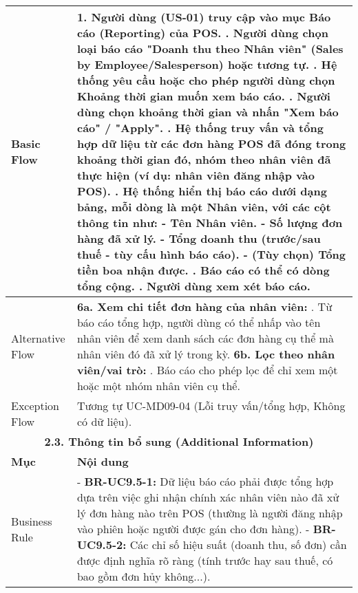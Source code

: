 \begin{longtable}{|m{4cm}|p{11cm}|}
Basic Flow & 1. Người dùng (US-01) truy cập vào mục Báo cáo (Reporting) của POS. \newline 2. Người dùng chọn loại báo cáo "Doanh thu theo Nhân viên" (Sales by Employee/Salesperson) hoặc tương tự. \newline 3. Hệ thống yêu cầu hoặc cho phép người dùng chọn Khoảng thời gian muốn xem báo cáo. \newline 4. Người dùng chọn khoảng thời gian và nhấn "Xem báo cáo" / "Apply". \newline 5. Hệ thống truy vấn và tổng hợp dữ liệu từ các đơn hàng POS đã đóng trong khoảng thời gian đó, nhóm theo nhân viên đã thực hiện (ví dụ: nhân viên đăng nhập vào POS). \newline 6. Hệ thống hiển thị báo cáo dưới dạng bảng, mỗi dòng là một Nhân viên, với các cột thông tin như: \newline    - Tên Nhân viên. \newline    - Số lượng đơn hàng đã xử lý. \newline    - Tổng doanh thu (trước/sau thuế - tùy cấu hình báo cáo). \newline    - (Tùy chọn) Tổng tiền boa nhận được. \newline 7. Báo cáo có thể có dòng tổng cộng. \newline 8. Người dùng xem xét báo cáo. \\
\hline
Alternative Flow & \textbf{6a. Xem chi tiết đơn hàng của nhân viên:} \newline    1. Từ báo cáo tổng hợp, người dùng có thể nhấp vào tên nhân viên để xem danh sách các đơn hàng cụ thể mà nhân viên đó đã xử lý trong kỳ. \newline \textbf{6b. Lọc theo nhân viên/vai trò:} \newline    1. Báo cáo cho phép lọc để chỉ xem một hoặc một nhóm nhân viên cụ thể. \\
\hline
Exception Flow & Tương tự UC-MD09-04 (Lỗi truy vấn/tổng hợp, Không có dữ liệu). \\
\hline
\multicolumn{2}{|c|}{\textbf{2.3. Thông tin bổ sung (Additional Information)}} \\
\hline
\textbf{Mục} & \textbf{Nội dung} \\
\hline
Business Rule & - \textbf{BR-UC9.5-1:} Dữ liệu báo cáo phải được tổng hợp dựa trên việc ghi nhận chính xác nhân viên nào đã xử lý đơn hàng nào trên POS (thường là người đăng nhập vào phiên hoặc người được gán cho đơn hàng). \newline - \textbf{BR-UC9.5-2:} Các chỉ số hiệu suất (doanh thu, số đơn) cần được định nghĩa rõ ràng (tính trước hay sau thuế, có bao gồm đơn hủy không...). \\

\end{longtable}
